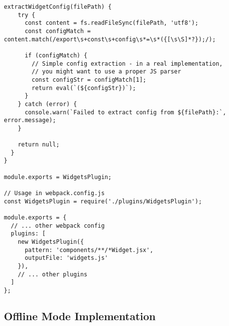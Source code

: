 \begin{lstlisting}[caption={Complete Webpack Widget Plugin Implementation}, captionpos=b, breaklines=true]
  extractWidgetConfig(filePath) {
    try {
      const content = fs.readFileSync(filePath, 'utf8');
      const configMatch = content.match(/export\s+const\s+config\s*=\s*({[\s\S]*?});/);
      
      if (configMatch) {
        // Simple config extraction - in a real implementation, 
        // you might want to use a proper JS parser
        const configStr = configMatch[1];
        return eval(`(${configStr})`);
      }
    } catch (error) {
      console.warn(`Failed to extract config from ${filePath}:`, error.message);
    }
    
    return null;
  }
}

module.exports = WidgetsPlugin;

// Usage in webpack.config.js
const WidgetsPlugin = require('./plugins/WidgetsPlugin');

module.exports = {
  // ... other webpack config
  plugins: [
    new WidgetsPlugin({
      pattern: 'components/**/*Widget.jsx',
      outputFile: 'widgets.js'
    }),
    // ... other plugins
  ]
};
\end{lstlisting}

\subsection{Offline Mode Implementation}
\label{appendix:offline_mode}


